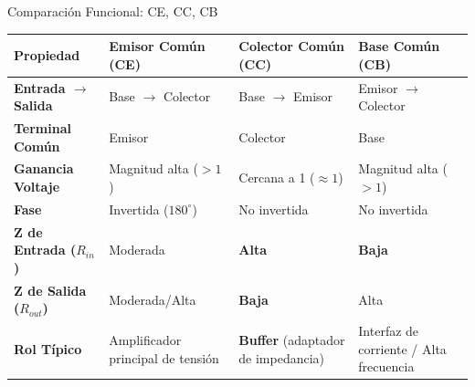 \documentclass[aspectratio=169, table, xcdraw]{beamer}
\begin{document}
\begin{frame}{Comparación Funcional: CE, CC, CB}
    \centering
    \renewcommand{\arraystretch}{1.4}
    \begin{tabularx}{0.95\textwidth}{|X|X|X|X|}
    \hline
    \rowcolor{ucbblue!20}
    \textbf{Propiedad} & \textbf{Emisor Común (CE)} & \textbf{Colector Común (CC)} & \textbf{Base Común (CB)} \\ \hline
    \textbf{Entrada $\to$ Salida} & Base $\to$ Colector & Base $\to$ Emisor & Emisor $\to$ Colector \\ \hline
    \textbf{Terminal Común} & Emisor & Colector & Base \\ \hline
    \textbf{Ganancia Voltaje} & Magnitud alta ($>1$) & Cercana a 1 ($\approx 1$) & Magnitud alta ($>1$) \\ \hline
    \textbf{Fase} & Invertida ($180^\circ$) & No invertida & No invertida \\ \hline
    \textbf{Z de Entrada ($R_{in}$)} & Moderada & \textbf{Alta} & \textbf{Baja} \\ \hline
    \textbf{Z de Salida ($R_{out}$)} & Moderada/Alta & \textbf{Baja} & Alta \\ \hline
    \textbf{Rol Típico} & Amplificador principal de tensión & \textbf{Buffer} (adaptador de impedancia) & Interfaz de corriente / Alta frecuencia \\ \hline
    \end{tabularx}
\end{frame}
\end{document}
